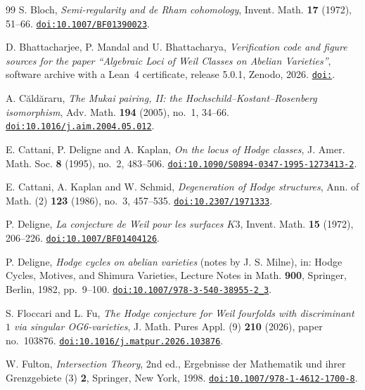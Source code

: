 \begin{thebibliography}{99}
S. Bloch,
\emph{Semi-regularity and de Rham cohomology},
Invent. Math. \textbf{17} (1972), 51--66.
\href{https://doi.org/10.1007/BF01390023}{\texttt{doi:10.1007/BF01390023}}.

D. Bhattacharjee, P. Mandal and U. Bhattacharya,
\emph{Verification code and figure sources for the paper ``Algebraic Loci of
Weil Classes on Abelian Varieties''}, software archive with a Lean~4
certificate, release 5.0.1, Zenodo, 2026.
\href{https://doi.org/\zenodoCodeID}{\texttt{doi:\zenodoCodeID}}.

A. C\u{a}ld\u{a}raru,
\emph{The Mukai pairing, II: the Hochschild--Kostant--Rosenberg isomorphism},
Adv. Math. \textbf{194} (2005), no.~1, 34--66.
\href{https://doi.org/10.1016/j.aim.2004.05.012}{\texttt{doi:10.1016/j.aim.2004.05.012}}.

E. Cattani, P. Deligne and A. Kaplan,
\emph{On the locus of Hodge classes},
J. Amer. Math. Soc. \textbf{8} (1995), no.~2, 483--506.
\href{https://doi.org/10.1090/S0894-0347-1995-1273413-2}{\texttt{doi:10.1090/S0894-0347-1995-1273413-2}}.

E. Cattani, A. Kaplan and W. Schmid,
\emph{Degeneration of Hodge structures},
Ann. of Math. (2) \textbf{123} (1986), no.~3, 457--535.
\href{https://doi.org/10.2307/1971333}{\texttt{doi:10.2307/1971333}}.

P. Deligne,
\emph{La conjecture de Weil pour les surfaces $K3$},
Invent. Math. \textbf{15} (1972), 206--226.
\href{https://doi.org/10.1007/BF01404126}{\texttt{doi:10.1007/BF01404126}}.

P. Deligne,
\emph{Hodge cycles on abelian varieties} (notes by J. S. Milne),
in: Hodge Cycles, Motives, and Shimura Varieties,
Lecture Notes in Math. \textbf{900}, Springer, Berlin, 1982, pp.~9--100.
\href{https://doi.org/10.1007/978-3-540-38955-2_3}%
{\texttt{doi:10.1007/978-3-540-38955-2\_3}}.

S. Floccari and L. Fu,
\emph{The Hodge conjecture for Weil fourfolds with discriminant $1$ via
singular OG6-varieties},
J. Math. Pures Appl. (9) \textbf{210} (2026), paper no.~103876.
\href{https://doi.org/10.1016/j.matpur.2026.103876}{\texttt{doi:10.1016/j.matpur.2026.103876}}.

W. Fulton,
\emph{Intersection Theory}, 2nd ed.,
Ergebnisse der Mathematik und ihrer Grenzgebiete (3) \textbf{2},
Springer, New York, 1998.
\href{https://doi.org/10.1007/978-1-4612-1700-8}{\texttt{doi:10.1007/978-1-4612-1700-8}}.


\end{thebibliography}

